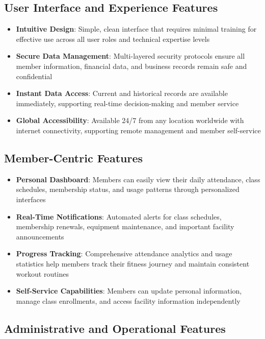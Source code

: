 \documentclass[12pt,a4paper]{report}
\begin{document}
\subsection{User Interface and Experience Features}

\begin{itemize}[leftmargin=*]
    \item \textbf{Intuitive Design}: Simple, clean interface that requires minimal training for effective use across all user roles and technical expertise levels
    \item \textbf{Secure Data Management}: Multi-layered security protocols ensure all member information, financial data, and business records remain safe and confidential
    \item \textbf{Instant Data Access}: Current and historical records are available immediately, supporting real-time decision-making and member service
    \item \textbf{Global Accessibility}: Available 24/7 from any location worldwide with internet connectivity, supporting remote management and member self-service
\end{itemize}

\subsection{Member-Centric Features}

\begin{itemize}[leftmargin=*]
    \item \textbf{Personal Dashboard}: Members can easily view their daily attendance, class schedules, membership status, and usage patterns through personalized interfaces
    \item \textbf{Real-Time Notifications}: Automated alerts for class schedules, membership renewals, equipment maintenance, and important facility announcements
    \item \textbf{Progress Tracking}: Comprehensive attendance analytics and usage statistics help members track their fitness journey and maintain consistent workout routines
    \item \textbf{Self-Service Capabilities}: Members can update personal information, manage class enrollments, and access facility information independently
\end{itemize}

\subsection{Administrative and Operational Features}
\end{document}
